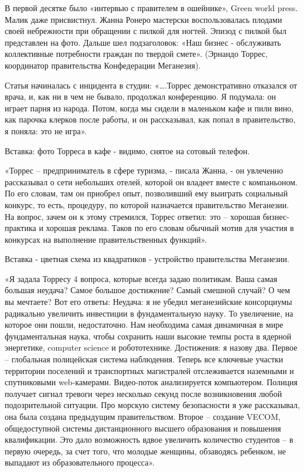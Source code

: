 В первой десятке было «интервью с правителем в ошейнике», Green world press. Малик даже присвистнул. Жанна Ронеро мастерски воспользовалась плодами своей небрежности при обращении с пилкой для ногтей. Эпизод с пилкой был представлен на фото. Дальше шел подзаголовок: «Наш бизнес - обслуживать коллективные потребности граждан по твердой смете». (Эрнандо Торрес, координатор правительства Конфедерации Меганезия).

Статья начиналась с инцидента в студии: «….Торрес демонстративно отказался от врача, и, как ни в чем не бывало, продолжал конференцию. Я подумала: он играет парня из народа. Потом, когда мы сидели в маленьком кафе и пили вино, как парочка клерков после работы, и он рассказывал, как попал в правительство, я поняла: это не игра».

Вставка: фото Торреса в кафе - видимо, снятое на сотовый телефон.

«Торрес – предприниматель в сфере туризма, - писала Жанна, - он увлеченно рассказывал о сети небольших отелей, которой он владеет вместе с компаньоном. По его словам, там он приобрел опыт, позволивший ему выиграть социальный конкурс, то есть, процедуру, по которой назначается правительство Меганезии. На вопрос, зачем он к этому стремился, Торрес ответил: это – хорошая бизнес-практика и хорошая реклама. Таков по его словам обычный мотив для участия в конкурсах на выполнение правительственных функций».

Вставка - цветная схема из квадратиков - устройство правительства Меганезии.

«Я задала Торресу 4 вопроса, которые всегда задаю политикам. Ваша самая большая неудача? Самое большое достижение? Самый смешной случай? О чем вы мечтаете?
Вот его ответы:
Неудача: я не убедил меганезийские консорциумы радикально увеличить инвестиции в фундаментальную науку. То увеличение, на которое они пошли, недостаточно. Нам необходима самая динамичная в мире фундаментальная наука, чтобы сохранить наши высокие темпы роста в ядерной энергетике, computer science и робототехнике.
Достижения: я назову два. Первое – глобальная полицейская система наблюдения. Теперь все ключевые участки территории поселений и транспортных магистралей отслеживается наземными и спутниковыми web-камерами. Видео-поток анализируется компьютером. Полиция получает сигнал тревоги через несколько секунд после возникновения любой подозрительной ситуации. Про морскую систему безопасности я уже рассказывал, она была создана предыдущим правительством. Второе – создание VECOM, общедоступной системы дистанционного высшего образования и повышения квалификации. Это дало возможность вдвое увеличить количество студентов – в первую очередь, за счет того, что молодые женщины, обзаводясь ребенком, не выпадают из образовательного процесса».

